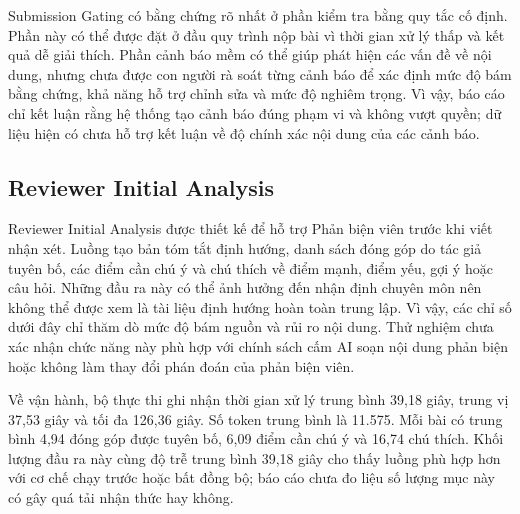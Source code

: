 Submission Gating có bằng chứng rõ nhất ở phần kiểm tra bằng quy tắc cố định. Phần này có thể được đặt ở đầu quy trình nộp bài vì thời gian xử lý thấp và kết quả dễ giải thích. Phần cảnh báo mềm có thể giúp phát hiện các vấn đề về nội dung, nhưng chưa được con người rà soát từng cảnh báo để xác định mức độ bám bằng chứng, khả năng hỗ trợ chỉnh sửa và mức độ nghiêm trọng. Vì vậy, báo cáo chỉ kết luận rằng hệ thống tạo cảnh báo đúng phạm vi và không vượt quyền; dữ liệu hiện có chưa hỗ trợ kết luận về độ chính xác nội dung của các cảnh báo.

\subsection{Reviewer Initial Analysis}

Reviewer Initial Analysis được thiết kế để hỗ trợ Phản biện viên trước khi viết nhận xét. Luồng tạo bản tóm tắt định hướng, danh sách đóng góp do tác giả tuyên bố, các điểm cần chú ý và chú thích về điểm mạnh, điểm yếu, gợi ý hoặc câu hỏi. Những đầu ra này có thể ảnh hưởng đến nhận định chuyên môn nên không thể được xem là tài liệu định hướng hoàn toàn trung lập. Vì vậy, các chỉ số dưới đây chỉ thăm dò mức độ bám nguồn và rủi ro nội dung. Thử nghiệm chưa xác nhận chức năng này phù hợp với chính sách cấm AI soạn nội dung phản biện hoặc không làm thay đổi phán đoán của phản biện viên.

Về vận hành, bộ thực thi ghi nhận thời gian xử lý trung bình 39,18 giây, trung vị 37,53 giây và tối đa 126,36 giây. Số token trung bình là 11.575. Mỗi bài có trung bình 4,94 đóng góp được tuyên bố, 6,09 điểm cần chú ý và 16,74 chú thích. Khối lượng đầu ra này cùng độ trễ trung bình 39,18 giây cho thấy luồng phù hợp hơn với cơ chế chạy trước hoặc bất đồng bộ; báo cáo chưa đo liệu số lượng mục này có gây quá tải nhận thức hay không.


